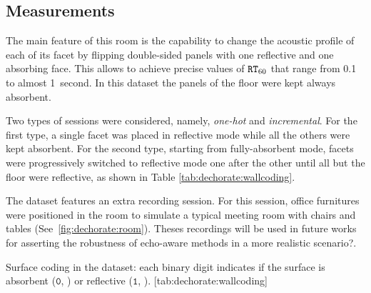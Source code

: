 \subsection{Measurements}
The main feature of this room is the capability to change the acoustic profile of each of its facet by flipping double-sided panels with one reflective and one absorbing face.
This allows to achieve precise values of $\mathtt{RT}_{60}$ that range from 0.1 to almost 1~second.
In this dataset the panels of the floor were kept always absorbent.

\mynewline
Two types of sessions were considered, namely, \textit{one-hot} and \textit{incremental}.
For the first type, a single facet was placed in reflective mode while all the others were kept absorbent.
For the second type, starting from fully-absorbent mode, facets were progressively switched to reflective mode one after the other until all but the floor were reflective, as shown in Table \ref{tab:dechorate:wallcoding}.

\mynewline
The dataset features an extra recording session.
For this session, office furnitures were positioned in the room to simulate a typical meeting room with chairs and tables (See~\cref{fig:dechorate:room}).
Theses recordings will be used in future works for asserting the robustness of echo-aware methods in a more realistic scenario?.

\begin{table}[h]
    \begin{sidecaption}[]{
        Surface coding in the dataset: each binary digit indicates if the surface is absorbent ($\mathtt{0}$, \xmark ) or reflective ($\mathtt{1}$, \cmark).
        }[tab:dechorate:wallcoding]
        \centering
        \small
        
    \end{sidecaption}
\end{table}


